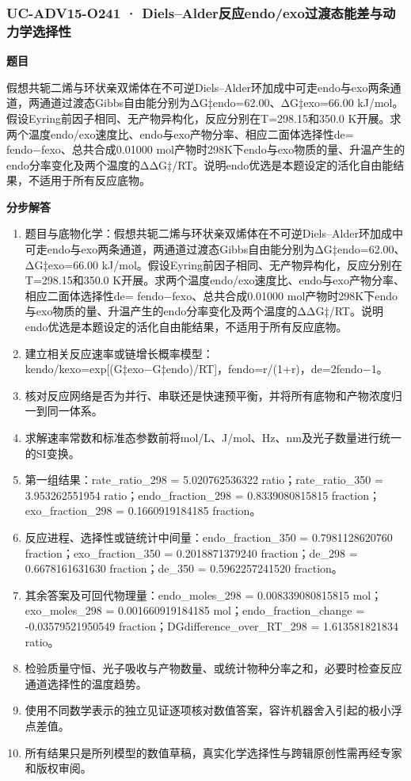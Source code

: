 \documentclass[UTF8,11pt,a4paper]{ctexart}
\begin{document}
\subsubsection*{UC-ADV15-O241 · Diels–Alder反应endo/exo过渡态能差与动力学选择性}
\noindent\textbf{题目}\par
假想共轭二烯与环状亲双烯体在不可逆Diels–Alder环加成中可走endo与exo两条通道，两通道过渡态Gibbs自由能分别为ΔG‡endo=62.00、ΔG‡exo=66.00 kJ/mol。假设Eyring前因子相同、无产物异构化，反应分别在T=298.15和350.0 K开展。求两个温度endo/exo速度比、endo与exo产物分率、相应二面体选择性de= fendo−fexo、总共合成0.01000 mol产物时298K下endo与exo物质的量、升温产生的endo分率变化及两个温度的ΔΔG‡/RT。说明endo优选是本题设定的活化自由能结果，不适用于所有反应底物。\par
\medskip\noindent\textbf{分步解答}
\begin{enumerate}
\item 题目与底物化学：假想共轭二烯与环状亲双烯体在不可逆Diels–Alder环加成中可走endo与exo两条通道，两通道过渡态Gibbs自由能分别为ΔG‡endo=62.00、ΔG‡exo=66.00 kJ/mol。假设Eyring前因子相同、无产物异构化，反应分别在T=298.15和350.0 K开展。求两个温度endo/exo速度比、endo与exo产物分率、相应二面体选择性de= fendo−fexo、总共合成0.01000 mol产物时298K下endo与exo物质的量、升温产生的endo分率变化及两个温度的ΔΔG‡/RT。说明endo优选是本题设定的活化自由能结果，不适用于所有反应底物。
\item 建立相关反应速率或链增长概率模型：kendo/kexo=exp[(G‡exo−G‡endo)/RT]，fendo=r/(1+r)，de=2fendo−1。
\item 核对反应网络是否为并行、串联还是快速预平衡，并将所有底物和产物浓度归一到同一体系。
\item 求解速率常数和标准态参数前将mol/L、J/mol、Hz、nm及光子数量进行统一的SI变换。
\item 第一组结果：rate\_ratio\_298 = 5.020762536322 ratio；rate\_ratio\_350 = 3.953262551954 ratio；endo\_fraction\_298 = 0.8339080815815 fraction；exo\_fraction\_298 = 0.1660919184185 fraction。
\item 反应进程、选择性或链统计中间量：endo\_fraction\_350 = 0.7981128620760 fraction；exo\_fraction\_350 = 0.2018871379240 fraction；de\_298 = 0.6678161631630 fraction；de\_350 = 0.5962257241520 fraction。
\item 其余答案及可回代物理量：endo\_moles\_298 = 0.008339080815815 mol；exo\_moles\_298 = 0.001660919184185 mol；endo\_fraction\_change = -0.03579521950549 fraction；DGdifference\_over\_RT\_298 = 1.613581821834 ratio。
\item 检验质量守恒、光子吸收与产物数量、或统计物种分率之和，必要时检查反应通道选择性的温度趋势。
\item 使用不同数学表示的独立见证逐项核对数值答案，容许机器舍入引起的极小浮点差值。
\item 所有结果只是所列模型的数值草稿，真实化学选择性与跨辑原创性需再经专家和版权审阅。
\end{enumerate}
\end{document}
